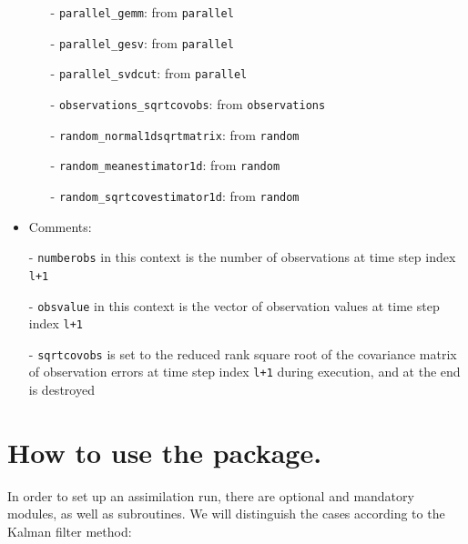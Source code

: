 \documentclass[12pt]{article}
\begin{document}
\begin{itemize}
\begin{itemize}
\item[-] {\tt parallel\_gemm}: from {\tt parallel}
\item[-] {\tt parallel\_gesv}: from {\tt parallel}
\item[-] {\tt parallel\_svdcut}: from {\tt parallel}
\item[-] {\tt observations\_sqrtcovobs}: from {\tt observations}
\item[-] {\tt random\_normal1dsqrtmatrix}: from {\tt random}
\item[-] {\tt random\_meanestimator1d}: from {\tt random}
\item[-] {\tt random\_sqrtcovestimator1d}: from {\tt random}
\end{itemize}
\item Comments: 
\item[-] {\tt numberobs} in this context is the number of observations at time step index {\tt l+1} 
\item[-] {\tt obsvalue} in this context is the vector of observation values at time step index {\tt l+1}
\item[-] {\tt sqrtcovobs} is set to the reduced rank square root of the covariance matrix of observation errors at time step index {\tt l+1} during execution, and at the end is destroyed 
\end{itemize} 

\section{How to use the package.}
In order to set up an assimilation run, there are optional and mandatory modules, as well as subroutines. We will distinguish the cases according to the Kalman filter method:

\end{document}
